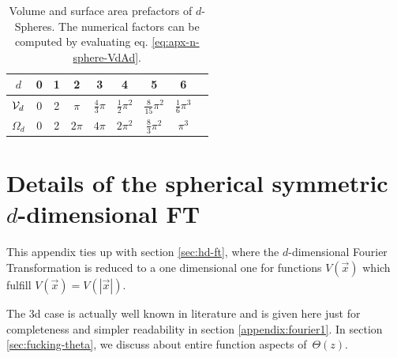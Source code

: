 \documentclass[12pt,a4paper]{report}
\numberwithin{equation}{chapter}
\begin{document}
\begin{appendices}
\begin{table}
\begin{center}
\renewcommand{\arraystretch}{1.5} %
\begin{tabular}{ccccccccc}
\firsthline
 $d$ & 0 & 1 & 2 & 3 & 4 & 5 & 6 \\
   \hline 
 ${\cal V}_d$ & 0 & 2 & $\pi$ & $\frac 43 \pi$ & $\frac 12 \pi^2$ & $\frac 8{15} \pi^2$ & $\frac 16 \pi^3$ 
   \\
   \hline
$\Omega_d$  & 0 & 2 & $2\pi$ & $4\pi$ & $2\pi^2$ & $\frac 83 \pi^2$ & $\pi^3$  \\
   \hline
\end{tabular}
\end{center}
\caption[Volume and surface area prefactors of $d$-Spheres]{Volume and surface area prefactors of $d$-Spheres. The numerical factors can be computed by evaluating eq. \eqref{eq:apx-n-sphere-VdAd}.}\label{apx:table:spheres}
\end{table}



\chapter{Details of the spherical symmetric $d$-dimensional FT} \label{appendix:fourier}
This appendix ties up with section \ref{sec:hd-ft}, where the $d$-dimensional Fourier Transformation is reduced to a one dimensional one for functions $V(\vec x)$ which fulfill $V(\vec x)=V(|\vec x|)$.

The 3d case is actually well known in literature and is given here just for completeness and simpler readability in section \ref{appendix:fourier1}. In section \ref{sec:fucking-theta}, we discuss about entire function aspects of~$\Theta(z)$.


\end{appendices}
\end{document}
